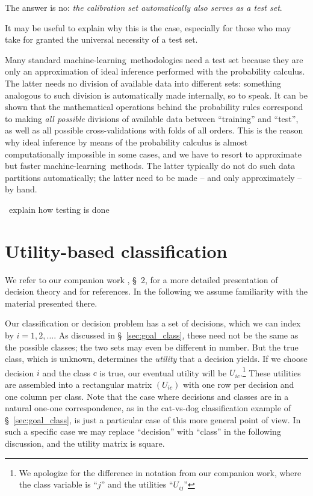 \documentclass[\ifafour a4paper,12pt,\else a5paper,10pt,\fi%
onecolumn,oneside,article,%
british%
]{memoir}
\theoremstyle{remark}
\theoremstyle{innote}
\newcommand*{\pencil}{{\fontencoding{U}\fontfamily{fontawesometwo}\selectfont\symbol{210}}}
\newcommand{\mynotep}[1]{{\footnotesize\color{notecolour}\pencil\ #1}}
\renewcommand*{\|}[1][]{\nonscript\:#1\vert\nonscript\:\mathopen{}}
\newcommand*{\sect}{\S}%
\newcommand*{\ml}{machine-learning}
\begin{document}
The answer is no: \emph{the calibration set automatically also serves as a test set}.

It may be useful to explain why this is the case, especially for those who may take for granted the universal necessity of a test set.

Many standard \ml\ methodologies need a test set because they are only an approximation of ideal inference performed with the probability calculus. The latter needs no division of available data into different sets: something analogous to such division is automatically made internally, so to speak. It can be shown \autocites{portamana2019b,fongetal2020,wald1949}[many examples of this fact are scattered across the text by][]{jaynes1994_r2003} that the mathematical operations behind the probability rules correspond to making \emph{all possible} divisions of available data between \enquote{training} and \enquote{test}, as well as all possible cross-validations with folds of all orders. This is the reason why ideal inference by means of the probability calculus is almost computationally impossible in some cases, and we have to resort to approximate but faster \ml\ methods. The latter typically do not do such data partitions automatically; the latter need to be made -- and only approximately -- by hand.


\mynotep{explain how testing is done}

\section{Utility-based classification}
\label{sec:utility_classification}

We refer to our companion work \cite{dyrlandetal2022}, \sect~2, for a more detailed presentation of decision theory and for references. In the following we assume familiarity with the material presented there.

Our classification or decision problem has a set of decisions, which we can index by $i = 1,2,\dotsc$. As discussed in \sect~\ref{sec:goal_class}, these need not be the same as the possible classes; the two sets may even be different in number. But the true class, which is unknown, determines the \emph{utility} that a decision yields. If we choose decision $i$ and the class $c$ is true, our eventual utility will be $U_{ic}$.\footnote{We apologize for the difference in notation from our companion work, where the class variable is \enquote{$j$} and the utilities \enquote{$U_{ij}$}} These utilities are assembled into a rectangular matrix $(U_{ic})$ with one row per decision and one column per class. Note that the case where decisions and classes are in a natural one-one correspondence, as in the cat-vs-dog classification example of \sect~\ref{sec:goal_class}, is just a particular case of this more general point of view. In such a specific case we may replace \enquote{decision} with \enquote{class} in the following discussion, and the utility matrix is square.
\end{document}
